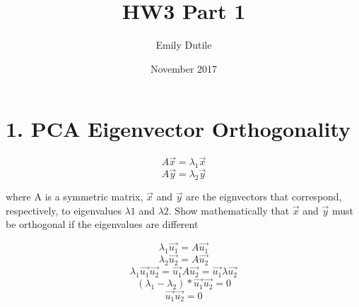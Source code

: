 \documentclass{neu_handout}
\title{HW3 Part 1}
\author{Emily Dutile}
\date{November 2017}
\begin{document}
\section*{1. PCA Eigenvector Orthogonality}

$$A\vec{x} = \lambda_1 \vec{x}$$
$$A\vec{y} = \lambda_2 \vec{y}$$

where A is a symmetric matrix, ${\vec{x}}$ and $\vec{y}$ are the eignvectors that correspond, respectively, to eigenvalues
$\lambda1$ and $\lambda2$. Show mathematically that $\vec{x}$ and $\vec{y}$ must be orthogonal if the eigenvalues are different

$$ \lambda_1 \vec{u_1} = A \vec{u_1} $$
$$ \lambda_2 \vec{u_2} = A \vec{u_2} $$
$$ \lambda_1 \vec{u_1} \vec{u_2} = \vec{u_1} A \vec{u_2} = \vec{u_1} \lambda \vec{u_2} $$
$$ (\lambda_1 - \lambda_2) * \vec{u_1} \vec{u_2} = 0 $$
$$ \vec{u_1} \vec{u_2} = 0 $$
\end{document}
